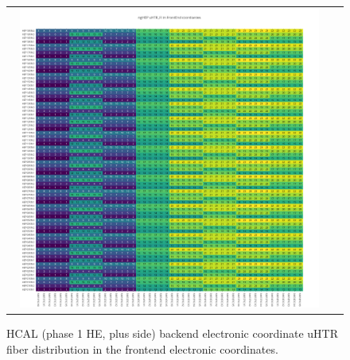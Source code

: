 \clearpage
\begin{figure}[htb]
 \begin{center}
  \begin{tabular}{cc}
   \includegraphics[angle=0,width=0.95\textwidth]{figures/appendix/ngHEP_uHTR_FI_in_FrontEnd.png}
  \end{tabular}
  \caption{HCAL (phase 1 HE, plus side) backend electronic coordinate uHTR fiber distribution in the frontend electronic coordinates.}
  \label{fig:lmapngHEPuHTRFIFEC}
 \end{center}
\end{figure}

